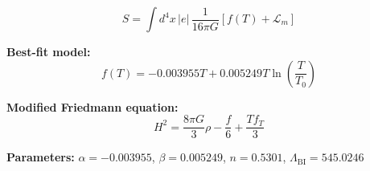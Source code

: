 
\begin{equation}
  S = \int d^4x \, |e| \, \frac{1}{16\pi G} \left[ f(T) + \mathcal{L}_m \right]
\end{equation}

\textbf{Best-fit model:}
\begin{equation}
  f(T) = -0.003955 T + 0.005249 T \ln\!\left(\frac{T}{T_0}\right)
\end{equation}

\textbf{Modified Friedmann equation:}
\begin{equation}
  H^2 = \frac{8\pi G}{3} \rho - \frac{f}{6} + \frac{T f_T}{3}
\end{equation}

\textbf{Parameters:}
$\alpha = -0.003955$, \quad
$\beta = 0.005249$, \quad
$n = 0.5301$, \quad
$\Lambda_{\text{BI}} = 545.0246$